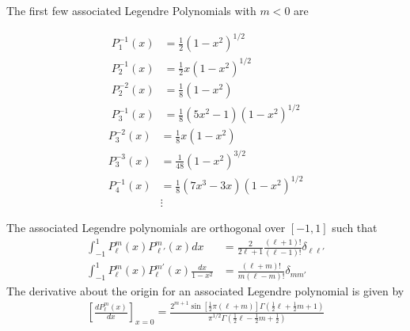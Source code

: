 The first few associated Legendre Polynomials with $m<0$ are
\begin{multicols}{2}
	\noindent
	\begin{align}
		P_1^{-1}(x) &= \frac{1}{2}(1-x^2)^{1/2} \\
		P_2^{-1}(x) &= \frac{1}{2}x(1-x^2)^{1/2} \\
		P_2^{-2}(x) &= \frac{1}{8}(1-x^2) \\
		P_3^{-1}(x) &= \frac{1}{8}(5x^2-1)(1-x^2)^{1/2} 
	\end{align}
	\begin{align}
		P_3^{-2}(x) &= \frac{1}{8}x(1-x^2) \\
		P_3^{-3}(x) &= \frac{1}{48}(1-x^2)^{3/2} \\
		P_4^{-1}(x) &= \frac{1}{8}(7x^3-3x)(1-x^2)^{1/2}\\
		&\vdots \nonumber
	\end{align}
\end{multicols}
The associated Legendre polynomials are orthogonal over $[-1,1]$ such that
\begin{align}
\int_{-1}^{1}P_\ell^m(x)P_{\ell'}^m(x)dx &= \frac{2}{2\ell+1}\frac{(\ell+1)!}{(\ell-1)!}\delta_{\ell\ell'} \\
\int_{-1}^{1}P_\ell^m(x)P_{\ell}^{m'}(x)\frac{dx}{1-x^2} &= \frac{(\ell+m)!}{m(\ell-m)!}\delta_{mm'}
\end{align}
The derivative about the origin for an associated Legendre polynomial is given by
\begin{align}
	\left[\frac{dP_\ell^m(x)}{dx}\right]_{x=0} = \frac{2^{m+1}\sin\left[\frac{1}{2}\pi(\ell+m)\right]\Gamma\left(\frac{1}{2}\ell+\frac{1}{2}m+1\right)}{\pi^{1/2
	}\Gamma\left(\frac{1}{2}\ell-\frac{1}{2}m+\frac{1}{2}\right)}
\end{align}
	


\newpage
